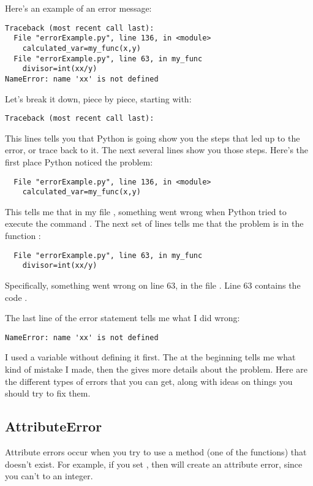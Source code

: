 Here's an example of an error message:
\begin{Verbatim}
Traceback (most recent call last):
  File "errorExample.py", line 136, in <module>
    calculated_var=my_func(x,y)
  File "errorExample.py", line 63, in my_func
    divisor=int(xx/y)
NameError: name 'xx' is not defined
\end{Verbatim}
Let's break it down, piece by piece, starting with:
\begin{Verbatim}
Traceback (most recent call last):
\end{Verbatim}
This lines tells you that Python is going show you the steps that led up to the error, or trace back to it.  The next several lines show you those steps.  Here's the first place Python noticed the problem:
\begin{Verbatim}
  File "errorExample.py", line 136, in <module>
    calculated_var=my_func(x,y)
\end{Verbatim}
This tells me that in my file , something went wrong when Python tried to execute the command .  The next set of lines tells me that the problem is in the function :
\begin{Verbatim}
  File "errorExample.py", line 63, in my_func
    divisor=int(xx/y)
\end{Verbatim}
Specifically, something went wrong on line 63, in the file . Line 63 contains the code .

The last line of the error statement tells me what I did wrong:
\begin{Verbatim}
NameError: name 'xx' is not defined
\end{Verbatim}
I used a variable  without defining it first. The  at the beginning tells me what kind of mistake I made, then the  gives more details about the problem.  Here are the different types of errors that you can get, along with ideas on things you should try to fix them.

\subsection*{AttributeError}
Attribute errors occur when you try to use a method (one of the  functions) that doesn't exist.  For example,  if you set , then  will create an attribute error, since you can't  to an integer.

